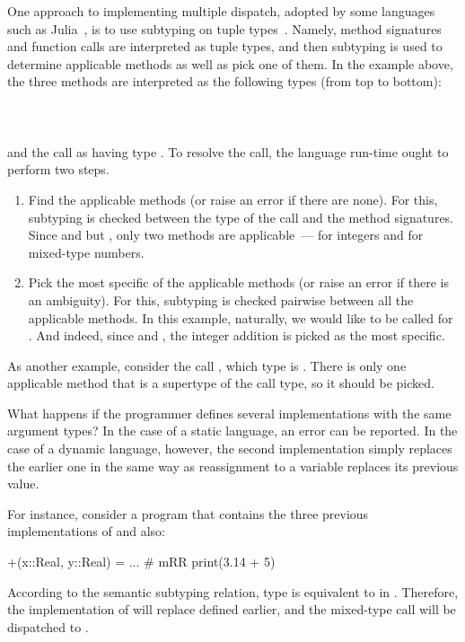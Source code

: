 One approach to implementing multiple dispatch, adopted by some languages
such as Julia~\cite{Bezanson2015AbstractionIT}, 
is to use subtyping on tuple types~\cite{bib:Leavens:1998:mddtuples}.
Namely, method signatures and function calls are interpreted as tuple types,
and then subtyping is used to determine applicable methods 
as well as pick one of them.
In the example above, the three methods are interpreted 
as the following types (from top to bottom):\\
\\
\\
\\
and the call as having type .
To resolve the call, the language run-time ought to perform two steps.
\begin{enumerate}
  \item Find the applicable methods (or raise an error if there are none). 
    For this, subtyping is checked between
    the type of the call  and the method signatures.
    Since  and  but
    , only two methods are applicable~---
     for integers and  for mixed-type numbers.
  \item Pick the most specific of the applicable methods
    (or raise an error if there is an ambiguity).
    For this, subtyping is checked pairwise between all the applicable methods.
    In this example, naturally, we would like  to be called
    for . And indeed, since 
    and ,
    the integer addition is picked as the most specific.
\end{enumerate}
As another example, consider the call , which type is
. There is only one applicable method 
that is a supertype of the call type, so it should be picked.

What happens if the programmer defines
several implementations with the same argument types? 
In the case of a static language, an error can be reported.
In the case of a dynamic language, however, the second implementation
simply replaces the earlier one in the same way as reassignment
to a variable replaces its previous value.

For instance, consider a program 
that contains the three previous implementations of \jlcode{(+)} %
and also: %
\begin{lstminijl}
+(x::Real, y::Real) = ...   # mRR
print(3.14 + 5)	 
\end{lstminijl}
According to the semantic subtyping relation, type  is equivalent
to  in \BetaJulia. 
Therefore, the implementation of  will replace 
 defined earlier, 
and the mixed-type call  will be dispatched to .

